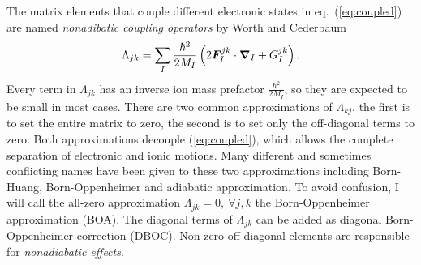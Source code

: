 The matrix elements that couple different electronic states in eq.~(\ref{eq:coupled}) are named \emph{nonadibatic coupling operators} by Worth and Cederbaum~\cite{Worth2004}
\begin{align}
\Lambda_{jk} = \sum_I \frac{\hbar^2}{2M_I}\left(2\boldsymbol{F}_I^{jk}\cdot\boldsymbol{\nabla}_I+G_I^{jk}\right).
\end{align}
Every term in $\Lambda_{jk}$ has an inverse ion mass prefactor $\frac{\hbar^2}{2M_I}$, so they are expected to be small in most cases. There are two common approximations of $\Lambda_{kj}$, the first is to set the entire matrix to zero, the second is to set only the off-diagonal terms to zero. Both approximations decouple (\ref{eq:coupled}), which allows the complete separation of electronic and ionic motions.
Many different and sometimes conflicting names have been given to these two approximations including Born-Huang, Born-Oppenheimer and adiabatic approximation. To avoid confusion, I will call the all-zero approximation $\Lambda_{jk}=0,~\forall j, k$ the Born-Oppenheimer approximation (BOA).
The diagonal terms of $\Lambda_{jk}$ can be added as diagonal Born-Oppenheimer correction (DBOC).
Non-zero off-diagonal elements are responsible for \textit{nonadiabatic effects}.

